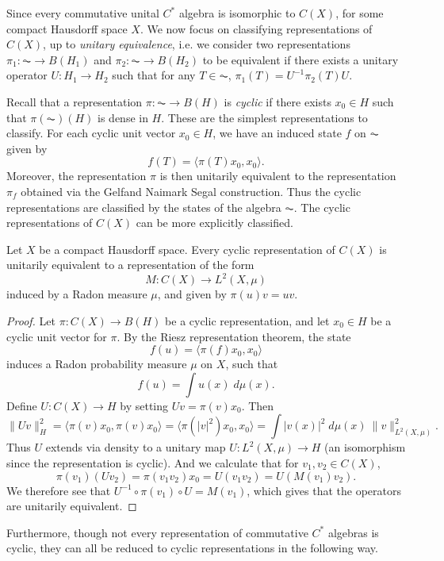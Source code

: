 Since every commutative unital $C^*$ algebra is isomorphic to $C(X)$, for some compact Hausdorff space $X$. We now focus on classifying representations of $C(X)$, up to \emph{unitary equivalence}, i.e. we consider two representations $\pi_1: \AC \to B(H_1)$ and $\pi_2: \AC \to B(H_2)$ to be equivalent if there exists a unitary operator $U: H_1 \to H_2$ such that for any $T \in \AC$, $\pi_1(T) = U^{-1} \pi_2(T) U$.

Recall that a representation $\pi: \AC \to B(H)$ is \emph{cyclic} if there exists $x_0 \in H$ such that $\pi(\AC)(H)$ is dense in $H$. These are the simplest representations to classify. For each cyclic unit vector $x_0 \in H$, we have an induced state $f$ on $\AC$ given by
%
\[ f(T) = \langle \pi(T) x_0, x_0 \rangle. \]
%
Moreover, the representation $\pi$ is then unitarily equivalent to the representation $\pi_f$ obtained via the Gelfand Naimark Segal construction. Thus the cyclic representations are classified by the states of the algebra $\AC$. The cyclic representations of $C(X)$ can be more explicitly classified.

\begin{theorem}
    Let $X$ be a compact Hausdorff space. Every cyclic representation of $C(X)$ is unitarily equivalent to a representation of the form
    \[ M: C(X) \to L^2(X,\mu) \]
    induced by a Radon measure $\mu$, and given by $\pi(u) v = u v$.
\end{theorem}
\begin{proof}
    Let $\pi: C(X) \to B(H)$ be a cyclic representation, and let $x_0 \in H$ be a cyclic unit vector for $\pi$. By the Riesz representation theorem, the state
    \[ f(u) = \langle \pi(f) x_0, x_0 \rangle \]
    induces a Radon probability measure $\mu$ on $X$, such that
    \[ f(u) = \int u(x)\; d\mu(x). \]
    Define $U: C(X) \to H$ by setting $Uv = \pi(v) x_0$. Then
    \[ \| Uv \|_H^2 = \langle \pi(v) x_0, \pi(v) x_0 \rangle = \langle \pi(|v|^2) x_0, x_0 \rangle = \int |v(x)|^2\; d\mu(x) \ \| v \|_{L^2(X,\mu)}^2. \]
    Thus $U$ extends via density to a unitary map $U: L^2(X,\mu) \to H$ (an isomorphism since the representation is cyclic). And we calculate that for $v_1,v_2 \in C(X)$,
    \[ \pi(v_1) (Uv_2) = \pi(v_1 v_2) x_0 = U(v_1 v_2) = U(M(v_1) v_2). \]
    We therefore see that $U^{-1} \circ \pi(v_1) \circ U = M(v_1)$, which gives that the operators are unitarily equivalent.
\end{proof}

Furthermore, though not every representation of commutative $C^*$ algebras is cyclic, they can all be reduced to cyclic representations in the following way.

